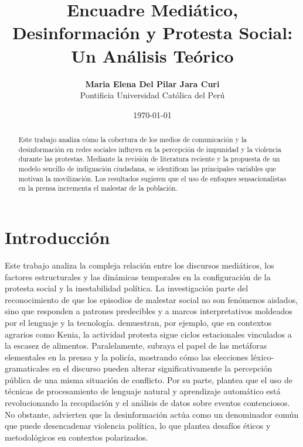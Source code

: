\documentclass[12pt, a4paper]{article}
\title{\textbf{Encuadre Mediático, Desinformación y Protesta Social: Un Análisis Teórico}}
\author{\textbf{Maria Elena Del Pilar Jara Curi}\\ \small Pontificia Universidad Católica del Perú}
\date{\today}
\begin{document}
\maketitle

\begin{abstract}
   Este trabajo analiza cómo la cobertura de los medios de comunicación y la desinformación en redes sociales influyen en la percepción de impunidad y la violencia durante las protestas. Mediante la revisión de literatura reciente y la propuesta de un modelo sencillo de indignación ciudadana, se identifican las principales variables que motivan la movilización. Los resultados sugieren que el uso de enfoques sensacionalistas en la prensa incrementa el malestar de la población.
    
\end{abstract}

\newpage

\section{Introducción}

Este trabajo analiza la compleja relación entre los discursos mediáticos, los factores estructurales y las dinámicas temporales en la configuración de la protesta social y la inestabilidad política. La investigación parte del reconocimiento de que los episodios de malestar social no son fenómenos aislados, sino que responden a patrones predecibles y a marcos interpretativos moldeados por el lenguaje y la tecnología. \cite{robiro_predictable_2026} demuestran, por ejemplo, que en contextos agrarios como Kenia, la actividad protesta sigue ciclos estacionales vinculados a la escasez de alimentos. Paralelamente, \cite{chen_press_2026} subraya el papel de las metáforas elementales en la prensa y la policía, mostrando cómo las elecciones léxico-gramaticales en el discurso pueden alterar significativamente la percepción pública de una misma situación de conflicto. Por su parte, \cite{mamaev_automating_2026} plantea que el uso de técnicas de procesamiento de lenguaje natural y aprendizaje automático está revolucionando la recopilación y el análisis de datos sobre eventos contenciosos. No obstante, \cite{voas_social_2025} advierten que la desinformación actúa como un denominador común que puede desencadenar violencia política, lo que plantea desafíos éticos y metodológicos en contextos polarizados.
\end{document}
